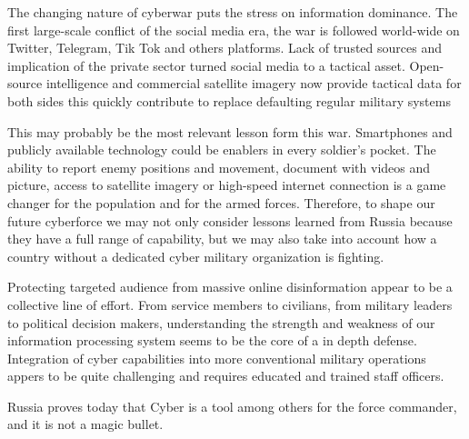 The changing nature of cyberwar puts the stress on information dominance. The first large-scale conflict of the social media era, the war is followed world-wide on Twitter, Telegram, Tik Tok and others platforms. Lack of trusted sources and implication of the private sector turned social media to a tactical asset. Open-source intelligence and commercial satellite imagery now provide tactical data for both sides this quickly contribute to replace defaulting regular military systems

This may probably be the most relevant lesson form this war. Smartphones and publicly available technology could be enablers in every soldier’s pocket. The ability to report enemy positions and movement, document with videos and picture, access to satellite imagery or high-speed internet connection is a game changer for the population and for the armed forces. Therefore, to shape our future cyberforce we may not only consider lessons learned from Russia because they have a full range of capability, but we may also take into account how a country without a dedicated cyber military organization is fighting. 

Protecting targeted audience from massive online disinformation appear to be a collective line of effort. From service members to civilians, from military leaders to political decision makers, understanding the strength and weakness of our information processing system seems to be the core of a in depth defense. Integration of cyber capabilities into more conventional military operations appers to be quite challenging and requires educated and trained staff officers.

Russia proves today that Cyber is a tool among others for the force commander, and it is not a magic bullet.

 
